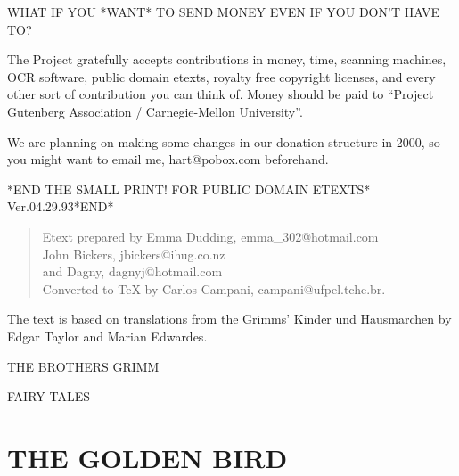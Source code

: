 \documentclass[12pt]{book}
\begin{document}
\begin{center}
WHAT IF YOU *WANT* TO SEND MONEY EVEN IF YOU DON'T HAVE TO?
\end{center}

The Project gratefully accepts contributions in money, time,
scanning machines, OCR software, public domain etexts, royalty
free copyright licenses, and every other sort of contribution
you can think of.  Money should be paid to ``Project Gutenberg
Association / Carnegie-Mellon University''.

We are planning on making some changes in our donation structure
in 2000, so you might want to email me, hart@pobox.com beforehand.




*END THE SMALL PRINT! FOR PUBLIC DOMAIN ETEXTS* \newline Ver.04.29.93*END*


\newpage

\begin{verse}
Etext prepared by Emma Dudding, emma\_302@hotmail.com \\
John Bickers, jbickers@ihug.co.nz \\
and Dagny, dagnyj@hotmail.com \\
Converted to \TeX{} by Carlos Campani, campani@ufpel.tche.br.
\end{verse}

\newpage


The text is based on translations from
the Grimms' Kinder und Hausmarchen by
Edgar Taylor and
Marian Edwardes.



\newpage

\vspace*{8cm}

\begin{center}
{\Huge
THE BROTHERS GRIMM

\vspace*{3cm}

FAIRY TALES
}
\end{center}

\tableofcontents

\chapter{THE GOLDEN BIRD}
\end{document}
